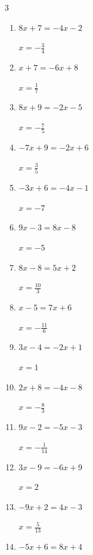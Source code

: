 \begin{multicols}{3}
\begin{enumerate}
        $\displaystyle x=-\frac{10}{11}$

  \item $8x+7=-4x-2$

        $\displaystyle x=-\frac{3}{4}$

\columnbreak %

\resetques

  \item $x+7=-6x+8$

        $\displaystyle x=\frac{1}{7}$

  \item $8x+9=-2x-5$

        $\displaystyle x=-\frac{7}{5}$

  \item $-7x+9=-2x+6$

        $\displaystyle x=\frac{3}{5}$

  \item $-3x+6=-4x-1$

        $\displaystyle x=-7$

  \item $9x-3=8x-8$

        $\displaystyle x=-5$

  \item $8x-8=5x+2$

        $\displaystyle x=\frac{10}{3}$

  \item $x-5=7x+6$

        $\displaystyle x=-\frac{11}{6}$

  \item $3x-4=-2x+1$

        $\displaystyle x=1$

  \item $2x+8=-4x-8$

        $\displaystyle x=-\frac{8}{3}$

  \item $9x-2=-5x-3$

        $\displaystyle x=-\frac{1}{14}$

  \item $3x-9=-6x+9$

        $\displaystyle x=2$

  \item $-9x+2=4x-3$

        $\displaystyle x=\frac{5}{13}$

  \item $-5x+6=8x+4$


\end{enumerate}
\end{multicols}

